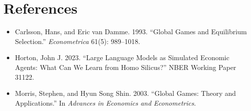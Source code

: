 \documentclass[11pt]{article}
\begin{document}
\section*{References}

\begin{itemize}
  \item Carlsson, Hans, and Eric van Damme. 1993. ``Global Games and Equilibrium Selection.'' \emph{Econometrica} 61(5): 989--1018.
  \item Horton, John J. 2023. ``Large Language Models as Simulated Economic Agents: What Can We Learn from Homo Silicus?'' NBER Working Paper 31122.
  \item Morris, Stephen, and Hyun Song Shin. 2003. ``Global Games: Theory and Applications.'' In \emph{Advances in Economics and Econometrics}.
\end{itemize}
\end{document}

